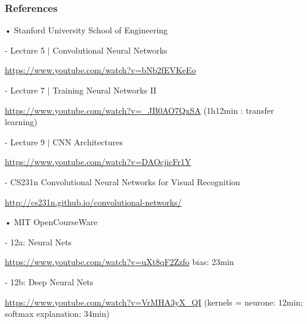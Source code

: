 \begin{frame}
\frametitle{References}
	
\begin{myitemize}
\item[•] Stanford University School of Engineering
	\begin{myitemize}
		\item[-] Lecture 5 $\vert$ Convolutional Neural Networks
		\item[] \url{https://www.youtube.com/watch?v=bNb2fEVKeEo}
		\item[-] Lecture 7 $\vert$ Training Neural Networks II
		\item[] \url{https://www.youtube.com/watch?v=_JB0AO7QxSA} (1h12min : transfer learning)
		\item[-] Lecture 9 $\vert$ CNN Architectures
		\item[] \url{https://www.youtube.com/watch?v=DAOcjicFr1Y}
		\item[-] CS231n Convolutional Neural Networks for Visual Recognition
		\item[] \url{http://cs231n.github.io/convolutional-networks/}
	\end{myitemize}
\item[•] MIT OpenCourseWare
	\begin{myitemize}
		\item[-] 12a: Neural Nets
		\item[] \url{https://www.youtube.com/watch?v=uXt8qF2Zzfo} {bias: 23min}
		\item[-] 12b: Deep Neural Nets
		\item[] \url{https://www.youtube.com/watch?v=VrMHA3yX_QI} (kernels = neurone: 12min; softmax explanation: 34min)
	\end{myitemize}
\end{myitemize}
\end{frame}


